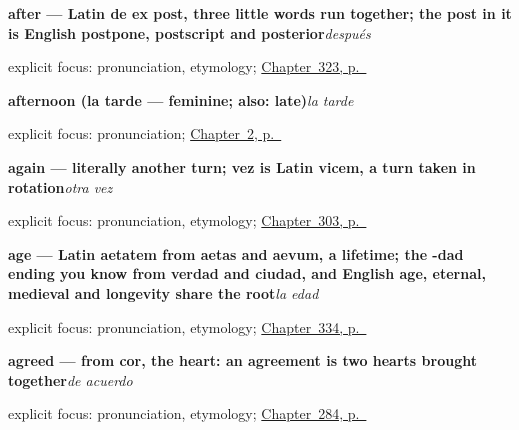 \noindent\begin{minipage}[t]{\linewidth}
\raggedright
\textbf{after — Latin de ex post, three little words run together; the post in it is English postpone, postscript and posterior}\enspace\emph{después}\par
\footnotesize explicit focus: pronunciation, etymology; \hyperref[ch:antes-y-despues]{Chapter~323, p.~\pageref*{ch:antes-y-despues}}
\end{minipage}\par\smallskip

\noindent\begin{minipage}[t]{\linewidth}
\raggedright
\textbf{afternoon (la tarde — feminine; also: late)}\enspace\emph{la tarde}\par
\footnotesize explicit focus: pronunciation; \hyperref[ch:greetings]{Chapter~2, p.~\pageref*{ch:greetings}}
\end{minipage}\par\smallskip

\noindent\begin{minipage}[t]{\linewidth}
\raggedright
\textbf{again — literally another turn; vez is Latin vicem, a turn taken in rotation}\enspace\emph{otra vez}\par
\footnotesize explicit focus: pronunciation, etymology; \hyperref[ch:reparaciones]{Chapter~303, p.~\pageref*{ch:reparaciones}}
\end{minipage}\par\smallskip

\noindent\begin{minipage}[t]{\linewidth}
\raggedright
\textbf{age — Latin aetatem from aetas and aevum, a lifetime; the -dad ending you know from verdad and ciudad, and English age, eternal, medieval and longevity share the root}\enspace\emph{la edad}\par
\footnotesize explicit focus: pronunciation, etymology; \hyperref[ch:salud-y-edad]{Chapter~334, p.~\pageref*{ch:salud-y-edad}}
\end{minipage}\par\smallskip

\noindent\begin{minipage}[t]{\linewidth}
\raggedright
\textbf{agreed — from cor, the heart: an agreement is two hearts brought together}\enspace\emph{de acuerdo}\par
\footnotesize explicit focus: pronunciation, etymology; \hyperref[ch:respuestas-cortas]{Chapter~284, p.~\pageref*{ch:respuestas-cortas}}
\end{minipage}\par\smallskip

